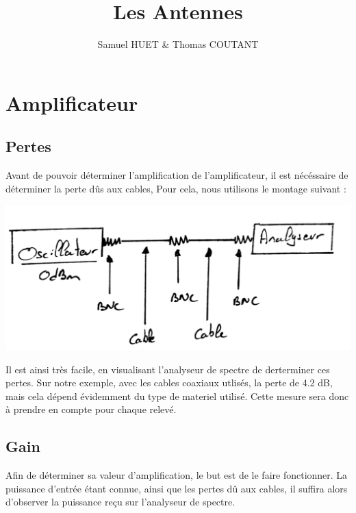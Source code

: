 \documentclass[a4paper,12pt]{report}            %
\author{Samuel HUET \& Thomas COUTANT}
\title{\huge{\textbf{Les Antennes}}}
\begin{document}
\maketitle
\renewcommand{\contentsname}{SOMMAIRE} %
\tableofcontents

\chapter{Amplificateur}

\section{Pertes}

Avant de pouvoir déterminer l'amplification de l'amplificateur, il est nécéssaire de déterminer la perte dûs aux cables, 
Pour cela, nous utilisons le montage suivant :

\begin{center}\includegraphics[scale = 0.2]{pic/mesure_perte.png}\\ \end{center}

Il est ainsi très facile, en visualisant l'analyseur de spectre de derterminer ces pertes.
Sur notre exemple, avec les cables coaxiaux utlisés, la perte de 4.2 dB, mais cela dépend évidemment du type de
materiel utilisé. Cette mesure sera donc à prendre en compte pour chaque relevé.

\section{Gain}

Afin de déterminer sa valeur d'amplification, le but est de le faire fonctionner. La puissance d'entrée étant
connue, ainsi que les pertes dû aux cables, il suffira alors d'observer la puissance reçu sur
l'analyseur de spectre.
\end{document}
